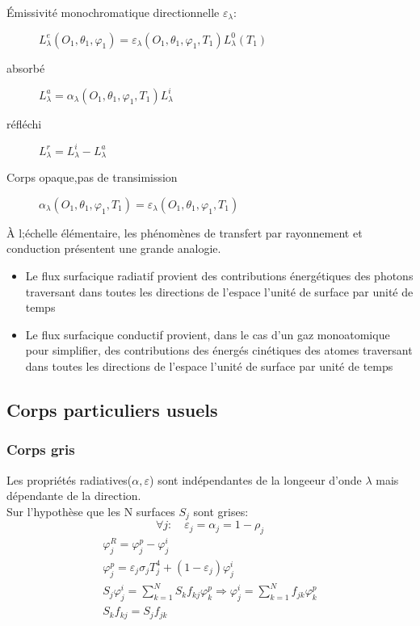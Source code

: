 \documentclass{article}
\begin{document}
\begin{description}
\item [\'Emissivit\'e monochromatique directionnelle $\varepsilon_{\lambda}$:] $L_{\lambda }^e(O_1,\theta_1,\varphi_1) = \varepsilon_{\lambda }(O_1,\theta_1,\varphi_1,T_1)L_{\lambda }^0(T_1)$
\item [absorb\'e]  $L_{\lambda}^a =\alpha_{\lambda }(O_1,\theta_1,\varphi_1,T_1)L_{\lambda}^i $
\item [r\'efl\'echi]  $L_{\lambda}^r = L_{\lambda}^i - L_{\lambda}^a$
\item [Corps opaque,pas de transimission] $\alpha_{\lambda }(O_1,\theta_1,\varphi_1,T_1)=\varepsilon_{\lambda }(O_1,\theta_1,\varphi_1,T_1)$
\end{description}

\bigskip
\`A l;\'echelle \'el\'ementaire, les ph\'enom\`enes de transfert par rayonnement et conduction pr\'esentent une grande analogie.
\begin{itemize}
\item Le flux surfacique radiatif provient des contributions \'energ\'etiques des photons traversant dans toutes les directions de l'espace l'unit\'e de surface par unit\'e de temps
\item Le flux surfacique conductif provient, dans le cas d'un gaz monoatomique pour simplifier, des contributions des \'energ\'es cin\'etiques des atomes traversant dans toutes les directions de l'espace l'unit\'e de surface par unit\'e de temps
\end{itemize}

\subsection{Corps particuliers usuels}
\subsubsection{Corps gris}
Les propri\'et\'es radiatives($\alpha,\varepsilon$) sont ind\'ependantes de la longeeur d'onde $\lambda $ mais d\'ependante de la direction.\\
Sur l'hypoth\`ese que les N surfaces $S_j$ sont grises:
$$\forall j: \quad \varepsilon_j =\alpha_j = 1- \rho_j$$
\begin{eqnarray}
\varphi_j^R=\varphi_j^p - \varphi_j^i \\
\varphi_j^p = \varepsilon_j \sigma_j T_j^4 +(1-\varepsilon_j)\varphi_j^i\\
S_j \varphi_j^i = \sum_{k=1}^N S_k f_{kj}\varphi_k^p \Rightarrow \varphi_j^i = \sum_{k=1}^N f_{jk}\varphi_k^p\\
S_k f_{kj}=S_j f_{jk}
\end{eqnarray}
\end{document}
